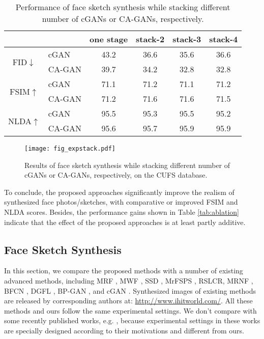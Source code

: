 \documentclass[journal]{IEEEtran}
\begin{document}
\begin{table}
\centering
\caption{Performance of face sketch synthesis while stacking different number of cGANs or CA-GANs, respectively.}
\label{tab:exp_stack}
\begin{tabular}{c|l|cccc}
\toprule											
	&		&	one stage	&	stack-2	&	stack-3	&	stack-4	\\
\midrule											
\multirow{2}{*}{FID$\downarrow$}	&	cGAN	&	43.2	&	36.6	&	35.6	&	36.6	\\
	&	CA-GAN	&	39.7	&	34.2	&	32.8	&	32.8	\\
\midrule											
\multirow{2}{*}{FSIM$\uparrow$}	&	cGAN	&	71.1	&	71.2	&	71.1	&	71.2	\\
	&	CA-GAN	&	71.2	&	71.6	&	71.6	&	71.5	\\
\midrule											
\multirow{2}{*}{NLDA$\uparrow$}	&	cGAN	&	95.5	&	95.3	&	95.5	&	95.2	\\
	&	CA-GAN	&	95.6	&	95.7	&	95.9	&	95.9	\\
\bottomrule	
\end{tabular}
\vspace{-0.5cm}
\end{table}




\begin{figure}
\centering
\texttt{[image: fig\_expstack.pdf]}
\vspace{-0.4cm}
\caption{Results of face sketch synthesis while stacking different number of cGANs or CA-GANs, respectively, on the CUFS database.}
\label{fig:exp_stack}
\vspace{-0.4cm}
\end{figure}
										

To conclude, the proposed approaches significantly improve the realism of synthesized face photos/sketches, with comparative or improved FSIM and NLDA scores. Besides, the performance gains shown in Table \ref{tab:ablation} indicate that the effect of the proposed approaches is at least partly additive.







\subsection{Face Sketch Synthesis}
\label{sec:photo2sketch}

In this section, we compare the proposed methods with a number of existing advanced methods, including MRF \cite{Wang2009Face}, MWF \cite{MWF}, SSD \cite{Song2014Real}, MrFSPS \cite{Peng2016Multiple}, RSLCR\cite{Wang2017RSLCR}, MRNF \cite{Zhang2018Markov}, BFCN \cite{BFCN}, DGFL \cite{Zhu2017Deep}, BP-GAN \cite{wang2017bpgan}, and cGAN \cite{Isola2017Pix2Pix}. Synthesized images of existing methods are released by corresponding authors at: \url{http://www.ihitworld.com/}. All these methods and ours follow the same experimental settings. We don't compare with some recently published works, e.g. \cite{Zhang2018IJCAI,Peng2019DeepPGM,Zhang2019TIP,Zhu2019ColGAN,Zhang2019MAL,Zhang2019TCYB}, because experimental settings in these works are specially designed according to their motivations and different from ours.
\end{document}
